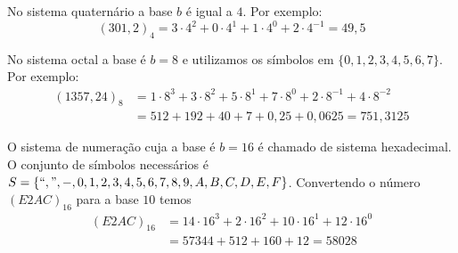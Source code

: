 \begin{ex}
No sistema quaternário a base $b$ é igual a $4$. Por exemplo:
  \begin{equation*}
    (301,2)_{4}=3\cdot 4^2+0\cdot 4^1+1\cdot 4^0+2\cdot 4^{-1}=49,5    
  \end{equation*}
\end{ex}

\begin{ex}
No sistema octal a base é $b=8$ e utilizamos os símbolos em $\{0, 1, 2, 3, 4, 5, 6, 7\}$. Por exemplo:
\begin{equation*}
  \begin{split}
    (1357,24)_{8}&= 1\cdot 8^3+3\cdot 8^2+5\cdot 8^1+7\cdot 8^{0}+2\cdot 8^{-1}+4\cdot 8^{-2}\\
    &= 512+192+40+7+0,25+0,0625=751,3125    
  \end{split}
\end{equation*}
\end{ex}

\begin{ex} O sistema de numeração cuja a base é $b=16$ é chamado de sistema hexadecimal. O conjunto de símbolos necessários é  $S=\{``,", -, 0, 1, 2, 3, 4, 5, 6, 7, 8, 9, A, B, C, D, E, F\}$. Convertendo o número $(E2AC)_{16}$ para a base $10$ temos
\begin{equation*}
  \begin{split}
  (E2AC)_{16} &= 14\cdot 16^3+2\cdot 16^2+10\cdot 16^1+12\cdot 16^{0}\\
  &=57344+512+160+12=58028  
  \end{split}
\end{equation*}
\end{ex}

